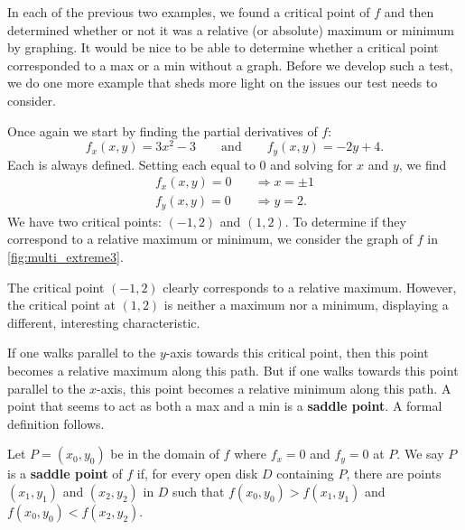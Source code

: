 In each of the previous two examples, we found a critical point of $f$ and then determined whether or not it was a relative (or absolute) maximum or minimum by graphing. It would be nice to be able to determine whether a critical point corresponded to a max or a min without a graph. Before we develop such a test, we do one more example that sheds more light on the issues our test needs to consider.\\

{Once again we start by finding the partial derivatives of $f$:
\[f_x(x,y) = 3x^2-3\qquad \text{and} \qquad f_y(x,y) = -2y+4.\]
Each is always defined. Setting each equal to 0 and solving for $x$ and $y$, we find
\begin{align*}
f_x(x,y) = 0 \quad &\Rightarrow x=\pm 1\\
f_y(x,y) = 0\quad &\Rightarrow y = 2.
\end{align*}
We have two critical points: $(-1,2)$ and $(1,2)$. To determine if they correspond to a relative maximum or minimum, we consider the graph of $f$ in \autoref{fig:multi_extreme3}.

The critical point $(-1,2)$ clearly corresponds to a relative maximum. However, the critical point at $(1,2)$ is neither a maximum nor a minimum, displaying a different, interesting characteristic. 

If one walks parallel to the $y$-axis towards this critical point, then this point becomes a relative maximum along this path. But if one walks towards this point parallel to the $x$-axis, this point becomes a relative minimum along this path. A point that seems to act as both a max and a min is a \textbf{saddle point}. A formal definition follows.}

{Let $P=(x_0,y_0)$ be in the domain of $f$ where $f_x=0$ and $f_y=0$ at $P$. We say $P$ is a \textbf{saddle point} of $f$ if, for every open disk $D$ containing $P$, there are points $(x_1,y_1)$ and $(x_2,y_2)$ in $D$ such that $f(x_0,y_0)>f(x_1,y_1)$ and $f(x_0,y_0)<f(x_2,y_2)$.
}

